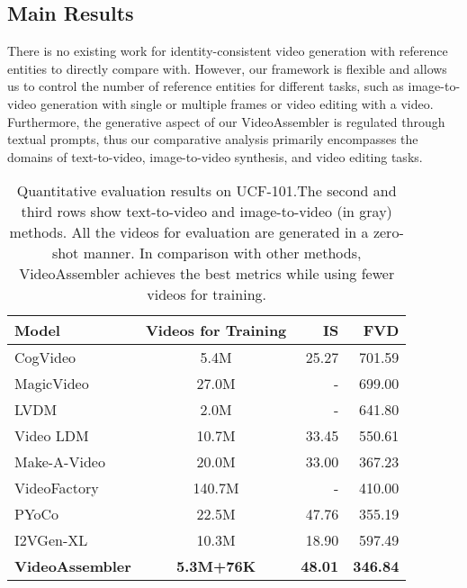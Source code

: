 \subsection{Main Results}

There is no existing work for identity-consistent video generation with reference entities to directly compare with. However, our framework is flexible and allows us to control the number of reference entities for different tasks, such as image-to-video generation with single or multiple frames or video editing with a video. Furthermore, the generative aspect of our VideoAssembler is regulated through textual prompts, thus our comparative analysis primarily encompasses the domains of text-to-video, image-to-video synthesis, and video editing tasks.

\begin{table}[ht]
    \setlength{\tabcolsep}{1.2mm}
    \centering
    \begin{tabular}{lcrr}
       \toprule
       Model & Videos for Training & IS  & FVD  \\
       \midrule
       CogVideo~\citep{hong2023cogvideo} & 5.4M & 25.27 & 701.59 \\
       MagicVideo~\citep{zhou2022magicvideo} & 27.0M & - & 699.00 \\
       LVDM~\citep{he2022lvdm} & 2.0M & - & 641.80 \\
       Video LDM~\citep{blattmann2023align} & 10.7M & 33.45 & 550.61 \\
       Make-A-Video~\citep{singer2022make} & 20.0M & 33.00 & 367.23 \\
       VideoFactory~\citep{wang2023videofactory} & 140.7M & - & 410.00 \\
       PYoCo~\cite{ge2023preserve}  & 22.5M & 47.76 & 355.19 \\
       \midrule
       \rowcolor{gray!20}
       \rowcolor{gray!20}
       I2VGen-XL~\cite{zhang2023i2vgen-xl} & 10.3M & 18.90 & 597.49 \\
       \midrule
       \textbf{VideoAssembler} & \textbf{5.3M+76K} & \textbf{48.01} & \textbf{346.84} \\
       \bottomrule
    \end{tabular}
    \caption{
    Quantitative evaluation results on UCF-101.The second and third rows show text-to-video and image-to-video (in gray) methods. All the videos for evaluation are generated in a zero-shot manner. 
    In comparison with other methods, VideoAssembler achieves the best metrics while using fewer videos for training.
    }
    \label{tab:eval_ucf101}
\end{table}

